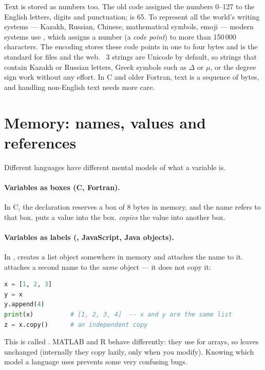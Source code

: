 Text is stored as numbers too. The old  code assigned the numbers 0--127 to
the English letters, digits and punctuation;  is 65. To represent all the
world's writing systems --- Kazakh, Russian, Chinese, mathematical symbols, emoji ---
modern systems use , which assigns a number (a \emph{code point}) to more
than 150\,000 characters. The  encoding stores these code points in one to
four bytes and is the standard for files and the web. \py~3 strings are Unicode by
default, so strings that contain Kazakh or Russian letters, Greek symbols such as
$\Delta$ or $\mu$, or the degree sign work without any effort. In C
and older Fortran, text is a sequence of bytes, and handling non-English text needs more
care.

\section{Memory: names, values and references}

Different languages have different mental models of what a variable is.

\paragraph{Variables as boxes (C, Fortran).}
In C, the declaration  reserves a box of 8 bytes in memory, and the name
 refers to that box.  puts a value into the box. 
\emph{copies} the value into another box.

\paragraph{Variables as labels (\py, JavaScript, Java objects).}
In \py,  creates a list object somewhere in memory and attaches the
name  to it.  attaches a second name to the \emph{same} object --- it
does not copy it:
\begin{lstlisting}[language=Python]
x = [1, 2, 3]
y = x
y.append(4)
print(x)          # [1, 2, 3, 4]  -- x and y are the same list
z = x.copy()      # an independent copy
\end{lstlisting}
This is called . MATLAB and R behave differently: they use
 for arrays, so  leaves  unchanged
(internally they copy lazily, only when you modify). Knowing which model a language uses
prevents some very confusing bugs.

